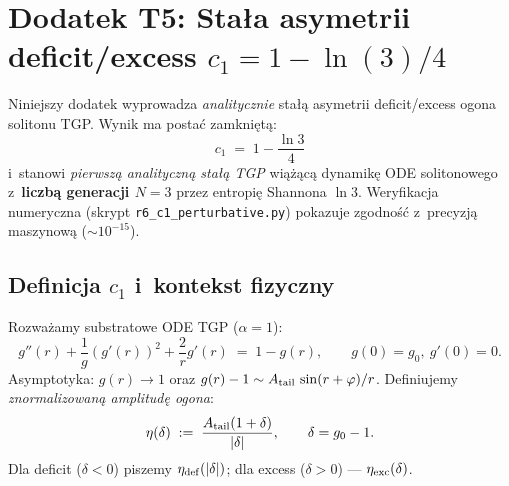 \section*{Dodatek T5: Stała asymetrii deficit/excess $c_1 = 1 - \ln(3)/4$}%
%
\label{app:T5-c1}

Niniejszy dodatek wyprowadza \emph{analitycznie} stałą asymetrii
deficit/excess ogona solitonu TGP. Wynik ma posta\'c zamkni\k{e}t\k{a}:
\begin{equation}\label{eq:T5-main}
  \boxed{c_1 \;=\; 1 - \frac{\ln 3}{4}}
\end{equation}
i~stanowi \emph{pierwsz\k{a} analityczn\k{a} sta\l{}\k{a} TGP} wi\k{a}\.z\k{a}c\k{a}
dynamik\k{e} ODE solitonowego z~\textbf{liczb\k{a} generacji $N=3$}
przez entropi\k{e} Shannona $\ln 3$. Weryfikacja numeryczna (skrypt
\texttt{r6\_c1\_perturbative.py}) pokazuje zgodno\'s\'c z~precyzj\k{a}
maszynow\k{a} ($\sim 10^{-15}$).

\medskip
\subsection{Definicja $c_1$ i~kontekst fizyczny}
\label{app:T5-def}

Rozwa\.zamy substratowe ODE TGP ($\alpha = 1$):
\begin{equation}\label{eq:T5-ode}
  g''(r) + \frac{1}{g}(g'(r))^2 + \frac{2}{r} g'(r) \;=\; 1 - g(r),
  \qquad g(0) = g_0,\ g'(0) = 0.
\end{equation}
Asymptotyka: $g(r) \to 1$ oraz $g(r) - 1 \sim A_{\rm tail}\,\sin(r+\varphi)/r$.
Definiujemy \emph{znormalizowan\k{a} amplitud\k{e} ogona}:
\begin{equation}\label{eq:T5-eta}
  \eta(\delta) \;:=\; \frac{A_{\rm tail}(1 + \delta)}{|\delta|},
  \qquad \delta = g_0 - 1.
\end{equation}
Dla deficit ($\delta < 0$) piszemy $\eta_{\rm def}(|\delta|)$;
dla excess ($\delta > 0$) --- $\eta_{\rm exc}(\delta)$.

